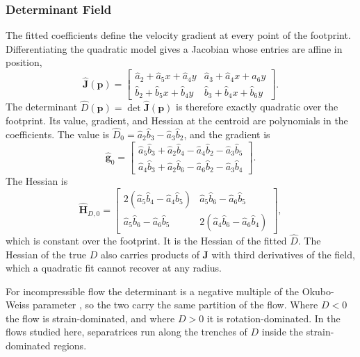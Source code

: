 \documentclass[lettersize,journal]{IEEEtran}
\begin{document}
\subsubsection{Determinant Field}
The fitted coefficients define the velocity gradient at every point of
the footprint. Differentiating the quadratic model gives a Jacobian whose
entries are affine in position,
\begin{equation}
    \hat{\mathbf{J}}(\mathbf{p}) =
    \begin{bmatrix}
        \hat{a}_2 + \hat{a}_5 x + \hat{a}_4 y &
        \hat{a}_3 + \hat{a}_4 x + \hat{a}_6 y \\
        \hat{b}_2 + \hat{b}_5 x + \hat{b}_4 y &
        \hat{b}_3 + \hat{b}_4 x + \hat{b}_6 y
    \end{bmatrix}.
    \label{eq:Jhat}
\end{equation}
The determinant $\hat{D}(\mathbf{p}) = \det\hat{\mathbf{J}}(\mathbf{p})$
is therefore exactly quadratic over the footprint. Its value, gradient,
and Hessian at the centroid are polynomials in the coefficients. The
value is $\hat{D}_0 = \hat{a}_2\hat{b}_3 - \hat{a}_3\hat{b}_2$, and the
gradient is
\begin{equation}
    \hat{\mathbf{g}}_0 =
    \begin{bmatrix}
        \hat{a}_5\hat{b}_3 + \hat{a}_2\hat{b}_4 - \hat{a}_4\hat{b}_2 - \hat{a}_3\hat{b}_5 \\
        \hat{a}_4\hat{b}_3 + \hat{a}_2\hat{b}_6 - \hat{a}_6\hat{b}_2 - \hat{a}_3\hat{b}_4
    \end{bmatrix}.
    \label{eq:grad_det}
\end{equation}
The Hessian is
\begin{equation}
    \hat{\mathbf{H}}_{D,0} =
    \begin{bmatrix}
        2(\hat{a}_5\hat{b}_4 - \hat{a}_4\hat{b}_5) &
        \hat{a}_5\hat{b}_6 - \hat{a}_6\hat{b}_5 \\
        \hat{a}_5\hat{b}_6 - \hat{a}_6\hat{b}_5 &
        2(\hat{a}_4\hat{b}_6 - \hat{a}_6\hat{b}_4)
    \end{bmatrix},
    \label{eq:hess_det}
\end{equation}
which is constant over the footprint. It is the Hessian of the fitted
$\hat{D}$. The Hessian of the true $D$ also carries products of
$\mathbf{J}$ with third derivatives of the field, which a quadratic fit
cannot recover at any radius.

For incompressible flow the determinant is a negative multiple of the
Okubo-Weiss parameter \cite{8,22}, so the two carry the same partition of
the flow. Where $D < 0$ the flow is strain-dominated, and where $D > 0$
it is rotation-dominated. In the flows studied here, separatrices run along the trenches of $D$
inside the strain-dominated regions.
\end{document}
